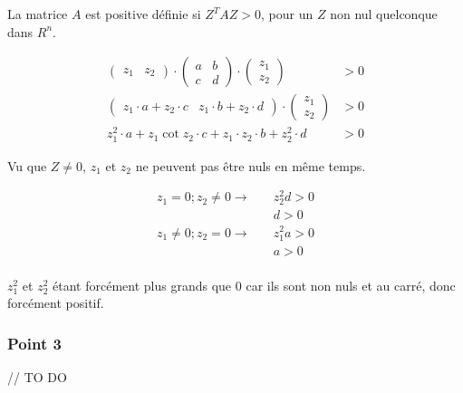 La matrice $A$ est positive définie si $Z^TAZ > 0$, pour un $Z$ non nul quelconque dans $R^n$.

\begin{equation}
	\begin{aligned}
		\begin{pmatrix}
		z_1 & z_2
		\end{pmatrix}\cdot
		\begin{pmatrix}
		a & b\\
		c & d
		\end{pmatrix}\cdot
		\begin{pmatrix}
		z_1\\
		z_2
		\end{pmatrix} &> 0\\
		\begin{pmatrix}
		z_1\cdot a + z_2\cdot c & z_1\cdot b + z_2\cdot d
		\end{pmatrix}\cdot
		\begin{pmatrix}
		z_1\\
		z_2
		\end{pmatrix} &> 0\\
		z_1^2\cdot a + z_1\cot z_2\cdot c + z_1 \cdot z_2 \cdot b + z_2^2\cdot d &> 0
	\end{aligned}
\end{equation}

Vu que $Z \neq 0$, $z_1$ et $z_2$ ne peuvent pas être nuls en même temps.

\begin{equation}
	\begin{aligned}
		z_1=0; z_2 \neq 0 \rightarrow &\quad z_2^2d>0\\
		&\quad d>0\\
		z_1\neq 0; z_2 = 0 \rightarrow &\quad z_1^2a>0\\
		&\quad a>0\\
	\end{aligned}
\end{equation}

$z_1^2$ et $z_2^2$ étant forcément plus grands que $0$ car ils sont non nuls et au carré, donc forcément positif.

\subsubsection{Point 3}

// TO DO